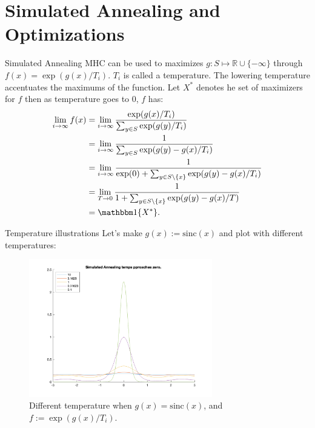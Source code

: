 \documentclass[11pt]{beamer}
\begin{document}
\section{Simulated Annealing and Optimizations}
    \begin{frame}{Simulated Annealing}
        MHC can be used to maximizes $g: S\mapsto \mathbb R\cup \{-\infty\}$ through $f(x) = \exp(g(x)/T_i)$. $T_i$ is called a temperature. The lowering temperature accentuates the maximums of the function. Let $X^{*}$ denotes he set of maximizers for $f$ then as temperature goes to $0$, $f$ has: 
        \begin{align*}
            \lim_{i\rightarrow \infty}f(x) 
            &= 
            \lim_{i\rightarrow \infty} \frac{\exp(g(x)/T_i)}
            {
                \sum_{y\in S}^{}
                \exp(g(y)/T_i)
            }
            \\
            &= 
            \lim_{i\rightarrow \infty}
            \frac{1}{\sum_{y\in S}^{}\exp(g(y) - g(x)/T_i)}
            \\
            &= 
            \lim_{i\rightarrow \infty}
            \frac{1}{\exp(0) + \sum_{y\in S\setminus\{x\}}^{}\exp(g(y) - g(x)/T_i)}
            \\
            &= 
            \lim_{T\rightarrow 0}
            \frac{1}{1 + \sum_{y\in S\setminus\{x\}}^{}\exp(g(y) - g(x)/T)}
            \\
            &= \mathbbm 1\{X^*\}. 
        \end{align*}
    \end{frame}    
    \begin{frame}{Temperature illustrations}
        Let's make $g(x):= \text{sinc}(x)$ and plot with different temperatures: 
        \begin{figure}[h]
            \centering
            \includegraphics[width=8cm]{sa_temp.png}
            \caption{Different temperature when $g(x) = \text{sinc}(x)$, and $f := \exp(g(x)/T_i)$. }
        \end{figure}
    \end{frame}
\end{document}

